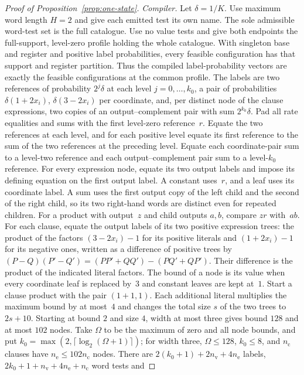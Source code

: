 \begin{proof}[Proof of Proposition~\ref{prop:one-state}]
\emph{Compiler.} Let $\delta=1/K$.
Use maximum word length $H=2$ and give each emitted test its own name.
The sole admissible word-test set is the full catalogue. Use no value tests
and give both endpoints the full-support, level-zero profile holding the
whole catalogue. With singleton base and register and positive label
probabilities, every feasible configuration has that support and register
partition. Thus the compiled label-probability vectors are exactly the
feasible configurations at the common profile.
The labels are two references of probability $2^j\delta$ at each level
$j=0,\dots,k_0$, a pair of probabilities $\delta(1+2x_i)$, $\delta(3-2x_i)$
per coordinate, and, per distinct node of the clause expressions, two
copies of an output--complement pair with sum $2^{k_0}\delta$. %
Pad all rate equalities and sums with the first level-zero reference~$r$.
Equate the two references at each level, and for each positive level
equate its first reference to the sum of the two references at the
preceding level. Equate each coordinate-pair sum to a level-two reference
and each output--complement pair sum to a level-$k_0$ reference. For every
expression node, equate its two output labels and impose its defining
equation on the first output label. A constant uses~$r$, and a leaf uses
its coordinate label. A sum uses the first output copy of the left child
and the second of the right child, so its two right-hand words are
distinct even for repeated children. For a product with output~$z$ and
child outputs $a,b$, compare $zr$ with~$ab$.
For each clause, equate the output labels of its two positive expression
trees: the product of the factors $(3-2x_i)-1$ for its positive literals
and $(1+2x_i)-1$ for its negative ones, written as a difference of positive trees by $(P-Q)(P'-Q')=(PP'+QQ')-(PQ'+QP')$. Their difference is the product of the indicated literal factors. %
The bound of a node is its value when every coordinate leaf is replaced
by~$3$ and constant leaves are kept at~$1$. Start a clause product with the
pair $(1+1,1)$. Each additional literal multiplies the maximum bound by at
most~$4$ and changes the total size $s$ of the two trees to $2s+10$.
Starting at bound $2$ and size $4$, width at most three gives bound $128$
and at most $102$ nodes. Take $\Omega$ to be the maximum of zero and all
node bounds, and put $k_0=\max(2,\lceil\log_2(\Omega+1)\rceil)$; for width
three, $\Omega\le128$, $k_0\le8$, and $n_{\mathrm c}$ clauses have
$n_{\mathrm e}\le102n_{\mathrm c}$ nodes.
There are $2(k_0+1)+2n_{\mathrm v}+4n_{\mathrm e}$ labels,
$2k_0+1+n_{\mathrm v}+4n_{\mathrm e}+n_{\mathrm c}$ word tests and

\end{proof}
